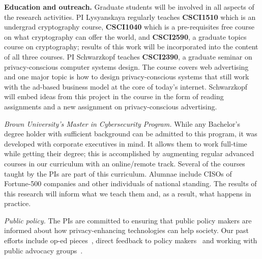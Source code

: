 \noindent\textbf{Education and outreach.} Graduate students will be involved in all aspects of the research activities.  PI Lysyanskaya
regularly teaches \textbf{CSCI1510} which is an undergrad cryptography course, \textbf{CSCI1040} which is a pre-requisites free course on what cryptography can offer the world, and \textbf{CSCI2590}, a graduate topics course on cryptography; results of this work will be incorporated into the content of all three courses.
%
PI Schwarzkopf teaches \textbf{CSCI2390}, a graduate seminar on privacy-conscious computer systems design. The course covers web advertising and one major topic is how to design privacy-conscious systems that still work with the ad-based business model at the core of today's internet. Schwarzkopf will embed ideas from this project in the course in the form of reading assignments and a new assignment on privacy-conscious advertising.
%

\noindent\textit{Brown University's Master in Cybersecurity Program.} While any Bachelor's degree holder with sufficient background can be admitted to this program, it was 
developed with corporate executives in mind. It allows them to work full-time while getting their degree; this is accomplished by augmenting regular advanced courses in our curriculum with an online/remote track.  Several of the courses taught by the PIs are part of this curriculum.  Alumnae include CISOs of Fortune-500 companies and other individuals of national standing.  
The results of this research will inform what we teach them and, as a result, what happens in practice.

\noindent\textit{Public policy.} The PIs are committed to ensuring that public policy makers are informed about how privacy-enhancing technologies can help society.  Our past efforts include op-ed pieces~\cite{projo1,csm,projo2}, direct feedback to policy makers~\cite{annacdt} and working with public advocacy groups~\cite{epic15}.  
